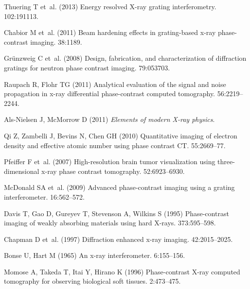 \documentclass{pnastwo}
\begin{document}
\begin{article}
\begin{thebibliography}{10}
Thuering T et~al. (2013) {Energy resolved X-ray grating interferometry}.
 102:191113.

Chabior M et~al. (2011) {Beam hardening effects in grating-based x-ray
  phase-contrast imaging}.
 38:1189.

Gr\"{u}nzweig C et~al. (2008) {Design, fabrication, and characterization of
  diffraction gratings for neutron phase contrast imaging.}
 79:053703.

Raupach R, Flohr TG (2011) {Analytical evaluation of the signal and noise
  propagation in x-ray differential phase-contrast computed tomography.}
 56:2219--2244.

\end{thebibliography}
\begin{thebibliography}{10}

Als-Nielsen J, McMorrow D (2011) {\em {Elements of modern X-ray physics}}.

Qi Z, Zambelli J, Bevins N, Chen GH (2010) {Quantitative imaging of electron
  density and effective atomic number using phase contrast CT.}
 55:2669--77.

Pfeiffer F et~al. (2007) {High-resolution brain tumor visualization using
  three-dimensional x-ray phase contrast tomography.}
 52:6923--6930.

McDonald SA et~al. (2009) {Advanced phase-contrast imaging using a grating
  interferometer}.
 16:562--572.

Davis T, Gao D, Gureyev T, Stevenson A, Wilkins S (1995) {Phase-contrast
  imaging of weakly absorbing materials using hard X-rays}.
 373:595--598.

Chapman D et~al. (1997) {Diffraction enhanced x-ray imaging}.
 42:2015--2025.

Bonse U, Hart M (1965) {An x-ray interferometer}.
 6:155--156.

Momose A, Takeda T, Itai Y, Hirano K (1996) {Phase-contrast X-ray computed
  tomography for observing biological soft tissues}.
 2:473--475.


\end{thebibliography}
\end{article}
\end{document}
